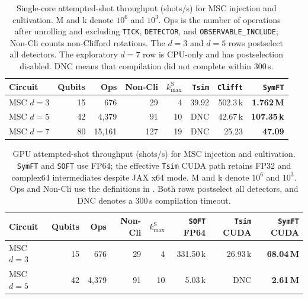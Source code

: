 \documentclass[a4paper,onecolumn,unpublished]{quantumarticle}
\newcommand{\cref}[1]{\zcref{#1}}
\newcommand{\tFont}[1]{\texttt{#1}}
\newcommand{\symft}{\tFont{SymFT}}
\newcommand{\soft}{\tFont{SOFT}}
\newcommand{\tsim}{\tFont{Tsim}}
\newcommand{\clifft}{\tFont{Clifft}}
\begin{document}
\begin{table}[H]
    \centering
    \setlength{\tabcolsep}{3.5pt}
    \caption{Single-core attempted-shot throughput (shots/s) for MSC injection and cultivation.
    M and k denote $10^6$ and $10^3$.
    Ops is the number of operations after unrolling and excluding \texttt{TICK}, \texttt{DETECTOR}, and \texttt{OBSERVABLE\_INCLUDE}; Non-Cli counts non-Clifford rotations.
    The $d=3$ and $d=5$ rows postselect all detectors.
    The exploratory $d=7$ row is CPU-only and has postselection disabled.
    DNC means that compilation did not complete within 300\,s.}
    \label{tab:benchmark-msc-cpu}
    \begin{tabular}{lrrrr|rrr}
        \toprule
        Circuit & Qubits & Ops & Non-Cli & $k_{\max}^{\mathrm S}$ & \tsim{} & \clifft{} & \symft{}\\
        \midrule
        MSC $d=3$ & 15 & 676 & 29 & 4
            & 39.92 & 502.3\,k & \textbf{1.762\,M}\\
        MSC $d=5$ & 42 & 4{,}379 & 91 & 10
            & DNC & 42.67\,k & \textbf{107.35\,k}\\
        MSC $d=7$ & 80 & 15{,}161 & 127 & 19
            & DNC & 25.23 & \textbf{47.09} \\
        \bottomrule
    \end{tabular}
    
\end{table}

\begin{table}[H]
    \centering
    \setlength{\tabcolsep}{3pt}
    \caption{GPU attempted-shot throughput (shots/s) for MSC injection and cultivation.
    \symft{} and \soft{} use FP64; the effective \tsim{} CUDA path retains FP32 and complex64 intermediates despite JAX x64 mode.
    M and k denote $10^6$ and $10^3$.
    Ops and Non-Cli use the definitions in \cref{tab:benchmark-msc-cpu}.
    Both rows postselect all detectors, and DNC denotes a 300\,s compilation timeout.}
    \label{tab:benchmark-msc-gpu}
    \begin{tabular}{lrrrr|rrr}
        \toprule
        Circuit & Qubits & Ops & Non-Cli & $k_{\max}^{\mathrm S}$ & \soft{} FP64 & \tsim{} CUDA & \symft{} CUDA \\
        \midrule
        MSC $d=3$ & 15 & 676 & 29 & 4
            & 331.50\,k & 26.93\,k & \textbf{68.04\,M} \\
        MSC $d=5$ & 42 & 4{,}379 & 91 & 10
            & 5.03\,k & DNC & \textbf{2.61\,M} \\
        \bottomrule
    \end{tabular}
\end{table}
\end{document}
